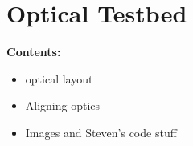 
\chapter{Optical Testbed} %
\noindent\textbf{\large Contents:}

\noindent\hrulefill
\noindent\startcontents[chapters]
\noindent{}
\noindent\hrulefill
\label{Chapter3} %

\begin{itemize}
    \item optical layout
    \item Aligning optics
    \item Images and Steven's code stuff
\end{itemize}